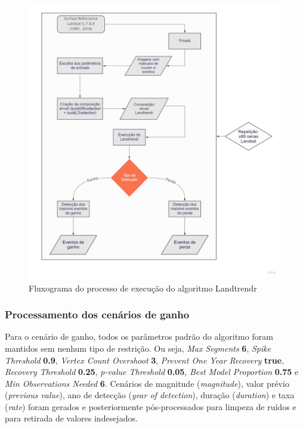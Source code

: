 \begin{figure}[H]
    \centering
    \includegraphics[scale=.5]{images/flowchart_medologia_landtrendr.pdf}
    \caption{Fluxograma do processo de execução do algoritmo Landtrendr}
    \label{fig:flowchart_medologia_landtrendr}
\end{figure}

\subsubsection{Processamento dos cenários de ganho}

\hspace{13pt} Para o cenário de ganho, todos os parâmetros padrão do algoritmo foram mantidos sem nenhum tipo de restrição. Ou seja, \textit{Max Segments} \textbf{6}, \textit{Spike Threshold} \textbf{0.9}, \textit{Vertex Count Overshoot} \textbf{3}, \textit{Prevent One Year Recovery} \textbf{true}, \textit{Recovery Threshold} \textbf{0.25}, \textit{p-value Threshold} \textbf{0.05}, \textit{Best Model Proportion} \textbf{0.75} e \textit{Min Observations Needed} \textbf{6}. Cenários de magnitude (\textit{magnitude}), valor prévio (\textit{previous value}), ano de detecção (\textit{year of detection}), duração (\textit{duration}) e taxa (\textit{rate}) foram gerados e posteriormente pós-processados para limpeza de ruídos e para retirada de valores indesejados. 

